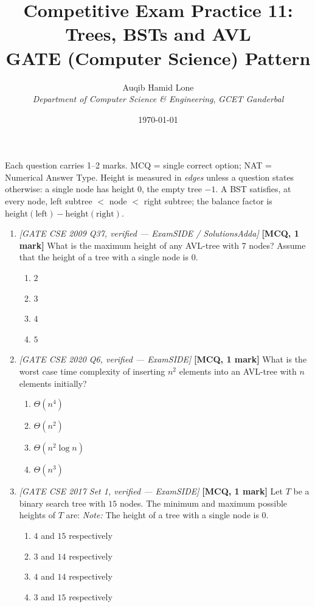 \documentclass[11pt]{article}
\title{Competitive Exam Practice 11: Trees, BSTs and AVL\\\large GATE (Computer Science) Pattern}
\author{Auqib Hamid Lone\\[0.3em]
  \emph{Department of Computer Science \& Engineering}, \emph{GCET Ganderbal}}
\date{\today}
\begin{document}
\maketitle

\noindent Each question carries 1--2 marks. MCQ = single correct option; NAT = Numerical Answer Type. Height is measured in \emph{edges} unless a question states otherwise: a single node has height $0$, the empty tree $-1$. A BST satisfies, at every node, left subtree $<$ node $<$ right subtree; the balance factor is $\mathrm{height}(\text{left})-\mathrm{height}(\text{right})$.

\begin{enumerate}
\item[\textbf{Q1}] \textit{[GATE CSE 2009 Q37, verified --- ExamSIDE / SolutionsAdda]} \textbf{[MCQ, 1 mark]} What is the maximum height of any AVL-tree with $7$ nodes? Assume that the height of a tree with a single node is $0$.
\begin{enumerate}
  \item[(A)] $2$
  \item[(B)] $3$
  \item[(C)] $4$
  \item[(D)] $5$
\end{enumerate}

\item[\textbf{Q2}] \textit{[GATE CSE 2020 Q6, verified --- ExamSIDE]} \textbf{[MCQ, 1 mark]} What is the worst case time complexity of inserting $n^{2}$ elements into an AVL-tree with $n$ elements initially?
\begin{enumerate}
  \item[(A)] $\Theta(n^{4})$
  \item[(B)] $\Theta(n^{2})$
  \item[(C)] $\Theta(n^{2}\log n)$
  \item[(D)] $\Theta(n^{3})$
\end{enumerate}

\item[\textbf{Q3}] \textit{[GATE CSE 2017 Set 1, verified --- ExamSIDE]} \textbf{[MCQ, 1 mark]} Let $T$ be a binary search tree with $15$ nodes. The minimum and maximum possible heights of $T$ are:
\emph{Note:} The height of a tree with a single node is $0$.
\begin{enumerate}
  \item[(A)] $4$ and $15$ respectively
  \item[(B)] $3$ and $14$ respectively
  \item[(C)] $4$ and $14$ respectively
  \item[(D)] $3$ and $15$ respectively
\end{enumerate}


\end{enumerate}
\end{document}
